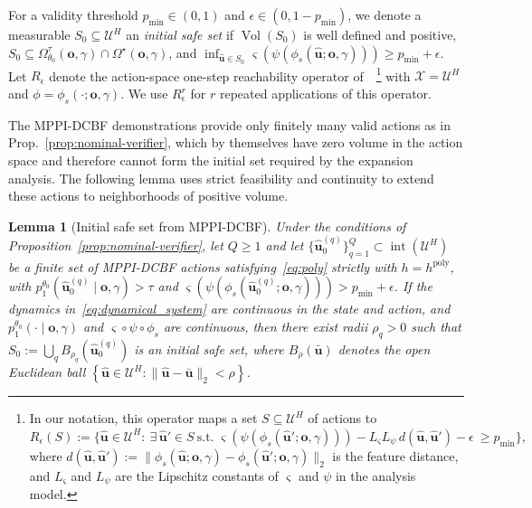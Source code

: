 \documentclass[letterpaper, 10 pt, conference]{ieeeconf}
\renewcommand{\o}{\mathbf{o}}
\newtheorem{lemma}{Lemma}
\begin{document}
For a validity threshold $p_{\min}\in(0,1)$ and $\epsilon\in(0,1-p_{\min})$, we denote a measurable $S_0\subseteq\mathcal U^H$ an \textit{initial safe set} if $\operatorname{Vol}(S_0)$ is well defined and positive, $S_0\subseteq\Omega^{\tau}_{\theta_0}(\o,\gamma)\cap\Omega^\star(\o,\gamma)$, and $\inf_{\hat{\mathbf u}\in S_0}\varsigma(\psi(\phi_s(\hat{\mathbf u};\o,\gamma))) \ge p_{\min}+\epsilon$. Let $R_\epsilon$ denote the action-space one-step reachability operator of~\cite[Eq.~(19)]{de2026active}~\footnote{In our notation, this operator maps a set $S\subseteq\mathcal U^H$ of actions to \(R_\epsilon(S)\!:=\!\{\hat{\mathbf u}\in\mathcal U^H\!:\!\!\!\ \exists\,\hat{\mathbf u}'\!\in\! S\ \text{s.t.}\;\varsigma(\psi(\phi_s(\hat{\mathbf u}'\!;\o,\!\gamma)\!)\!)\!-\!L_\varsigma L_\psi\,d(\hat{\mathbf u},\!\hat{\mathbf u}')\!-\!\epsilon\ \!\!\ge\!p_{\min}\},\) where $d(\hat{\mathbf u},\hat{\mathbf u}'):=\|\phi_s(\hat{\mathbf u};\o,\gamma)-\phi_s(\hat{\mathbf u}';\o,\gamma)\|_2$ is the feature distance, and $L_\varsigma$ and $L_\psi$ are the Lipschitz constants of $\varsigma$ and $\psi$ in the analysis model.} with $\mathcal X=\mathcal U^H$ and $\phi=\phi_s(\cdot;\o,\gamma)$. We use  $R_\epsilon^r$ for $r$ repeated applications of this operator.

The MPPI-DCBF demonstrations provide only finitely many valid actions as in Prop.~\ref{prop:nominal-verifier}, which by themselves have zero volume in the action space and therefore cannot form the initial set required by the expansion analysis.
The following lemma uses strict feasibility and continuity to extend these actions to neighborhoods of positive volume.
\begin{lemma}[Initial safe set from MPPI-DCBF]
\label{lem:seed}
Under the conditions of Proposition~\ref{prop:nominal-verifier}, let $Q\ge1$ and let $\{\hat{\mathbf u}_0^{(q)}\}_{q=1}^{Q}\subset\operatorname{int}(\mathcal U^H)$ be a finite set of MPPI-DCBF actions satisfying~\eqref{eq:poly} strictly with $h=h^{\mathrm{poly}}$, with $p_1^{\theta_0}(\hat{\mathbf u}_0^{(q)}\mid\o,\gamma)>\tau$ and $\varsigma(\psi(\phi_s(\hat{\mathbf u}_0^{(q)};\o,\gamma)))>p_{\min}+\epsilon$. 
If the dynamics in~\eqref{eq:dynamical_system} are continuous in the state and action,
and
$p_1^{\theta_0}(\cdot\mid\o,\gamma)$ and $\varsigma\circ \psi\circ\phi_s$ are
continuous, then there exist radii $\rho_q>0$ such that
$S_0:=\bigcup_q B_{\rho_q}(\hat{\mathbf u}_0^{(q)})$ is an initial safe set, where \(B_\rho(\bar{\mathbf u})\) denotes the open Euclidean ball \(\left\{\hat{\mathbf u}\!\in\!\mathcal U^H\!:\!\|\hat{\mathbf u}\!-\!\bar{\mathbf u}\|_2\!<\!\rho\right\}\).
\end{lemma}
\end{document}
